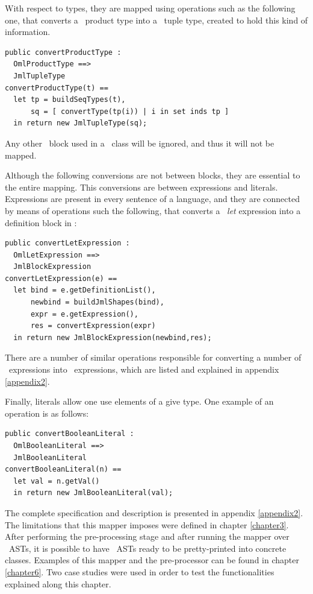 With respect to types, they are mapped using operations such as the following one, that converts a \vpp\ product type into a \jml\ tuple type, created to hold this kind of information.

\bigskip
\begin{lstlisting}
public convertProductType :
  OmlProductType ==>
  JmlTupleType
convertProductType(t) ==
  let tp = buildSeqTypes(t),
      sq = [ convertType(tp(i)) | i in set inds tp ]
  in return new JmlTupleType(sq);
\end{lstlisting}
\bigskip
Any other \vpp\ block used in a \vpp\ class will be ignored, and thus it will not be mapped.

Although the following conversions are not between blocks, they are essential to the entire mapping. This conversions are between expressions and literals. Expressions are present in every sentence of a language, and they are connected by means of operations such the following, that converts a \jml\ \textit{let} expression into a definition block in \jml :

\bigskip
\begin{lstlisting}
public convertLetExpression :
  OmlLetExpression ==>
  JmlBlockExpression
convertLetExpression(e) ==
  let bind = e.getDefinitionList(),
      newbind = buildJmlShapes(bind),
      expr = e.getExpression(),
      res = convertExpression(expr)
  in return new JmlBlockExpression(newbind,res);
\end{lstlisting}
\bigskip

There are a number of similar operations responsible for converting a number of \vpp\ expressions into \jml\ expressions, which are listed and explained in appendix \ref{appendix2}.

Finally, literals allow one use elements of a give type. One example of an operation is as follows:
\bigskip
\begin{lstlisting}
public convertBooleanLiteral :
  OmlBooleanLiteral ==>
  JmlBooleanLiteral
convertBooleanLiteral(n) ==
  let val = n.getVal()
  in return new JmlBooleanLiteral(val);
\end{lstlisting}
\bigskip

The complete specification and description is presented in appendix \ref{appendix2}. The limitations that this mapper imposes were defined in chapter \ref{chapter3}. After performing the pre-processing stage and after running the mapper over \vpp\ ASTs, it is possible to have \jml\ ASTs ready to be pretty-printed into concrete classes. Examples of this mapper and the pre-processor can be found in chapter \ref{chapter6}. Two case studies were used in order to test the functionalities explained along this chapter.

